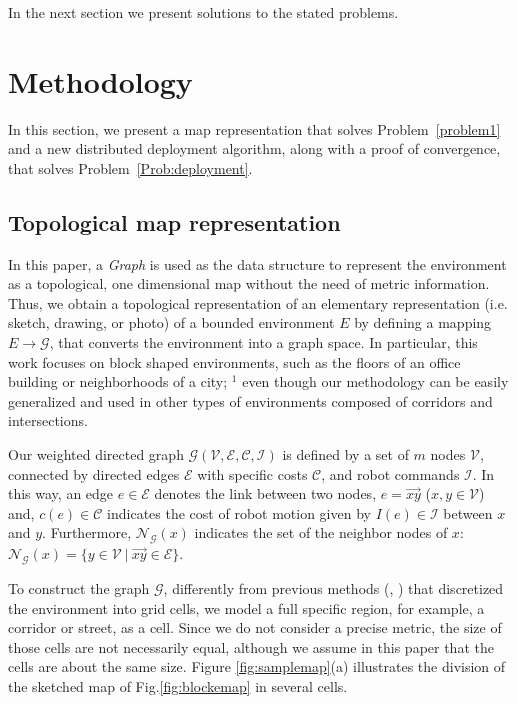 \documentclass[smallcondensed]{svjour3}
\begin{document}
In the next section we present solutions
to the stated problems.


\section{Methodology}
\label{sec:methodology}

In this section, we present a map representation that solves Problem~\ref{problem1} and a new distributed deployment algorithm, along with a proof of convergence, that solves Problem~\ref{Prob:deployment}.

\subsection{Topological map representation}
\label{sec:topologymap}

In this paper, a \textit{Graph} is used as the data structure to represent the environment as a topological, one dimensional map without the need of metric information. Thus, we obtain a topological representation of an elementary representation (i.e. sketch, drawing, or photo) of a bounded environment $E$ by defining a mapping $E \rightarrow \mathcal{G}$, that converts the environment into a graph space. In particular, this work focuses on block shaped environments, such as the floors of an office building or neighborhoods of a city;{\color{blue} $^1$ even though our methodology can be easily generalized and used in other types of environments composed of corridors and intersections.}
%

Our weighted directed graph $\mathcal{G}(\mathcal{V},\mathcal{E},\mathcal{C},\mathcal{I})$ is defined by a set of $m$ nodes $\mathcal{V}$, connected by directed edges $\mathcal{E}$ with specific costs $\mathcal{C}$, and robot commands $\mathcal{I}$. In this way, an edge $e \in \mathcal{E}$ denotes the link between two nodes, $e=\overrightarrow{xy}$ ($x,y \in \mathcal{V}$) and, $c(e) \in \mathcal{C}$ indicates the cost of robot motion given by $I(e) \in \mathcal{I}$ between $x$ and $y$. Furthermore, $\mathcal{N}_{\mathcal{G}}(x)$ indicates the set of the neighbor nodes of $x$: $ \mathcal{N}_{\mathcal{G}}(x) = \{ y \in \mathcal{V} ~\big|~ \overrightarrow{xy} \in \mathcal{E}\}$.

To construct the graph $\mathcal{G}$, differently from previous methods (\cite{Yun2013}, \cite{Durham2012}) that discretized the environment into grid cells, we model a full specific region, for example, a corridor or street, as a cell. Since we do not consider a precise metric, the size of those cells are not necessarily equal, although we assume in this paper that the cells are about the same size. Figure \ref{fig:samplemap}(a) illustrates the division of the sketched  map of Fig.\ref{fig:blockemap} in several cells. 
\end{document}
